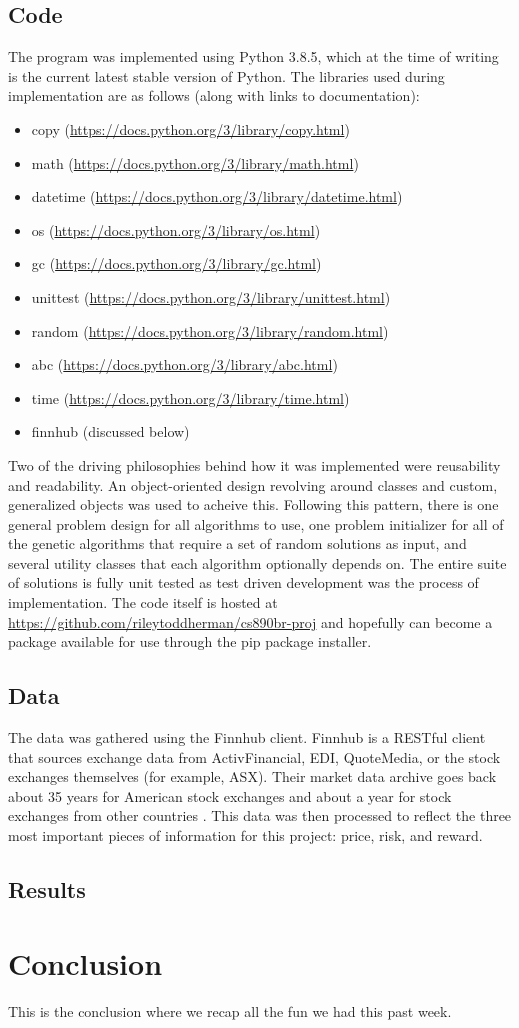 \documentclass{article}
\begin{document}
    \subsection{Code}
    The program was implemented using Python 3.8.5, which at the time of writing is the current latest stable version of Python. The libraries used during 
    implementation are as follows (along with links to documentation):
    \begin{itemize}
        \item copy (\url{https://docs.python.org/3/library/copy.html})
        \item math (\url{https://docs.python.org/3/library/math.html})
        \item datetime (\url{https://docs.python.org/3/library/datetime.html})
        \item os (\url{https://docs.python.org/3/library/os.html})
        \item gc (\url{https://docs.python.org/3/library/gc.html})
        \item unittest (\url{https://docs.python.org/3/library/unittest.html})
        \item random (\url{https://docs.python.org/3/library/random.html})
        \item abc (\url{https://docs.python.org/3/library/abc.html})
        \item time (\url{https://docs.python.org/3/library/time.html})
        \item finnhub (discussed below)
    \end{itemize}
    Two of the driving philosophies behind how it was implemented were reusability and readability. An object-oriented design revolving around classes and 
    custom, generalized objects was used to acheive this. Following this pattern, there is one general problem design for all algorithms to use, one 
    problem initializer for all of the genetic algorithms that require a set of random solutions as input, and several utility classes that each algorithm
    optionally depends on. \cite{ReillyRalstonHemmendinger} The entire suite of solutions is fully unit tested as test driven development was the process of implementation. \cite{Beck} The code itself 
    is hosted at \url{https://github.com/rileytoddherman/cs890br-proj} and hopefully can become a package available for use through the pip package installer.
    \subsection{Data}
    The data was gathered using the Finnhub client. Finnhub is a RESTful client that sources exchange data from ActivFinancial, EDI, QuoteMedia, or the stock 
    exchanges themselves (for example, ASX). Their market data archive goes back about 35 years for American stock exchanges and about a year for stock exchanges
    from other countries \cite{Finnhub} \cite{Allamaraju}. This data was then processed to reflect the three most important pieces of information for this project: 
    price, risk, and reward.
    \subsection{Results}
    \section{Conclusion}
    This is the conclusion where we recap all the fun we had this past week.
    \newpage
    \printbibliography
\end{document}
